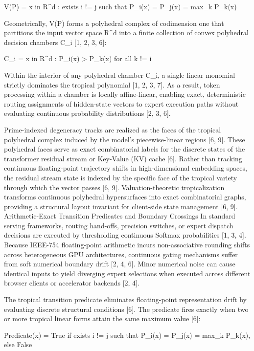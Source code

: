 V(P) = { x in R^d : exists i != j such that P_i(x) = P_j(x) = max_k P_k(x) }


Geometrically, V(P) forms a polyhedral complex of codimension one that partitions the input vector space R^d into a finite collection of convex polyhedral decision chambers C_i [1, 2, 3, 6]:


C_i = { x in R^d : P_i(x) > P_k(x) for all k != i }


Within the interior of any polyhedral chamber C_i, a single linear monomial strictly dominates the tropical polynomial [1, 2, 3, 7]. As a result, token processing within a chamber is locally affine-linear, enabling exact, deterministic routing assignments of hidden-state vectors to expert execution paths without evaluating continuous probability distributions [2, 3, 6].


Prime-indexed degeneracy tracks are realized as the faces of the tropical polyhedral complex induced by the model's piecewise-linear regions [6, 9]. These polyhedral faces serve as exact combinatorial labels for the discrete states of the transformer residual stream or Key-Value (KV) cache [6]. Rather than tracking continuous floating-point trajectory shifts in high-dimensional embedding spaces, the residual stream state is indexed by the specific face of the tropical variety through which the vector passes [6, 9]. Valuation-theoretic tropicalization transforms continuous polyhedral hypersurfaces into exact combinatorial graphs, providing a structural layout invariant for client-side state management [6, 9].
Arithmetic-Exact Transition Predicates and Boundary Crossings
In standard serving frameworks, routing hand-offs, precision switches, or expert dispatch decisions are executed by thresholding continuous Softmax probabilities [1, 3, 4]. Because IEEE-754 floating-point arithmetic incurs non-associative rounding shifts across heterogeneous GPU architectures, continuous gating mechanisms suffer from soft numerical boundary drift [2, 4, 6]. Minor numerical noise can cause identical inputs to yield diverging expert selections when executed across different browser clients or accelerator backends [2, 4].


The tropical transition predicate eliminates floating-point representation drift by evaluating discrete structural conditions [6]. The predicate fires exactly when two or more tropical linear forms attain the same maximum value [6]:


Predicate(x) = True if exists i != j such that P_i(x) = P_j(x) = max_k P_k(x), else False


